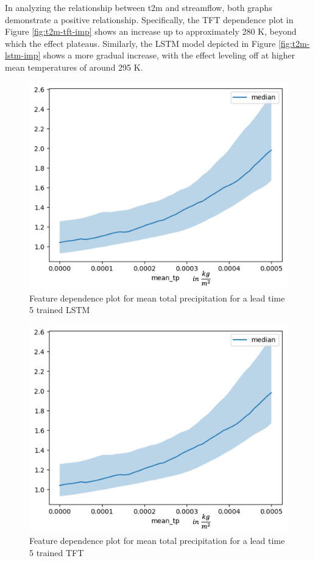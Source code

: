 \documentclass[
]{krantz}
\begin{document}
In analyzing the relationship between t2m and streamflow, both graphs demonstrate a positive relationship. Specifically, the TFT dependence plot in Figure \ref{fig:t2m-tft-imp} shows an increase up to approximately 280 K, beyond which the effect plateaus. Similarly, the LSTM model depicted in Figure \ref{fig:t2m-lstm-imp} shows a more gradual increase, with the effect leveling off at higher mean temperatures of around 295 K.

\begin{figure}

{\centering \includegraphics[width=0.7\linewidth]{work/07-hydroLSTM/images/mean_tp_feature_importance_lstm} 

}

\caption{Feature dependence plot for mean total precipitation for a lead time 5 trained LSTM}\label{fig:tp-lstm-imp}
\end{figure}

\begin{figure}

{\centering \includegraphics[width=0.7\linewidth]{work/07-hydroLSTM/images/mean_tp_feature_importance_tft} 

}

\caption{Feature dependence plot for mean total precipitation for a lead time 5 trained TFT}\label{fig:tp-tft-imp}
\end{figure}
\end{document}

